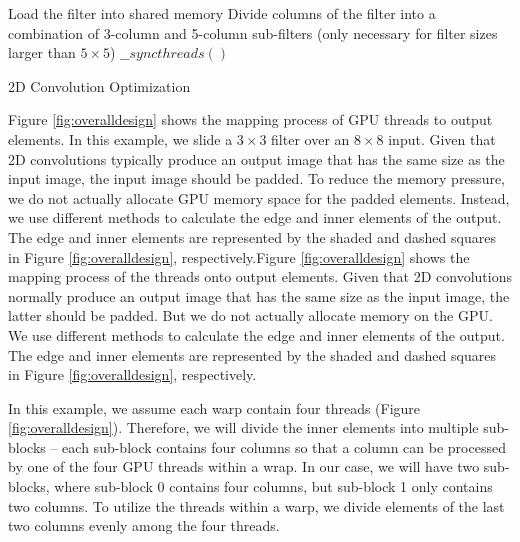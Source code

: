 \begin{algorithm}
	Load the filter into shared memory\;
	Divide columns of the filter into a combination of 3-column and 5-column sub-filters (only necessary for filter sizes larger than $5 \times 5$)\;
	$\_\_syncthreads()$\;
	\caption{2D Convolution Optimization}
	\label{algo:overalldesign}
\end{algorithm}

Figure \ref{fig:overalldesign} shows the mapping process of GPU threads to output elements. In this example, we slide a $3 \times 3$ filter
over an $8 \times 8$ input.  Given that 2D convolutions typically produce an output image that has the same size as the input image, the
input image should be padded. To reduce the memory pressure, we do not actually allocate GPU memory space for the padded elements. Instead,
we use different methods to calculate the edge and inner elements of the output. The edge and inner elements are represented by the shaded
and dashed squares in Figure \ref{fig:overalldesign}, respectively.Figure \ref{fig:overalldesign} shows the mapping process of the threads
onto output elements. Given that 2D convolutions normally produce an output image that has the same size as the input image, the latter
should be padded. But we do not actually allocate memory on the GPU. We use different methods to calculate the edge and inner elements of
the output. The edge and inner elements are represented by the shaded and dashed squares in Figure \ref{fig:overalldesign}, respectively.


In this example, we assume each warp contain four threads (Figure \ref{fig:overalldesign}). Therefore, we will divide the inner elements
into multiple sub-blocks – each sub-block contains four columns so that a column can be processed by one of the four GPU threads within a
wrap. In our case, we will have two sub-blocks, where sub-block 0 contains four columns, but sub-block 1 only contains two columns. To
utilize the threads within a warp, we divide elements of the last two columns evenly among the four threads.

